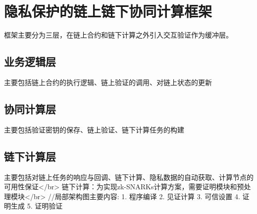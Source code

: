 \chapter{隐私保护的链上链下协同计算框架}
框架主要分为三层，在链上合约和链下计算之外引入交互验证作为缓冲层。

\section{业务逻辑层}
主要包括链上合约的执行逻辑、链上验证的调用、对链上状态的更新

\section{协同计算层}
主要包括验证密钥的保存、链上验证、链下计算任务的构建

\section{链下计算层}
主要包括对链上任务的响应与回调、链下计算、隐私数据的自动获取、计算节点的可用性保证</br>
链下计算：为实现zk-SNARKs计算方案，需要证明模块和预处理模块</br>
//局部架构图主要内容:
1. 程序编译
2. 见证计算
3. 可信设置
4. 证明生成
5. 证明验证